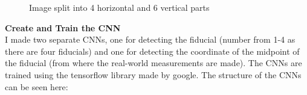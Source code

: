 \begin{figure}[H]
    \centering
    \caption{Image split into 4 horizontal and 6 vertical parts}\label{fig:figure}
\end{figure}
\textbf{Create and Train the CNN}\\
I made two separate CNNs, one for detecting the fiducial (number from 1-4 as there are four fiducials) and one for detecting the coordinate of the midpoint of the fiducial (from where the real-world measurements are made).
The CNNs are trained using the tensorflow library made by google.
The structure of the CNNs can be seen here:
